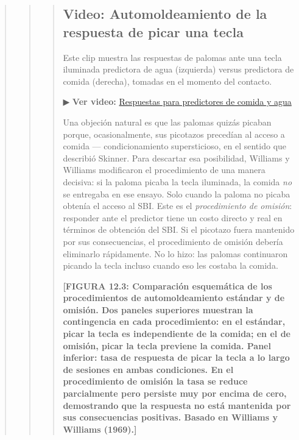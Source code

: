 \documentclass[
  letterpaper,
  DIV=11,
  numbers=noendperiod]{scrreprt}
\begin{document}
\begin{tcolorbox}[enhanced jigsaw, arc=.35mm, bottomrule=.15mm, breakable, colback=white, colframe=quarto-callout-note-color-frame, left=2mm, leftrule=.75mm, opacityback=0, rightrule=.15mm, toprule=.15mm]
\begin{quote}
\begin{quote}
\begin{quote}
\mbox{}%
\subsection{\texorpdfstring{ Video: Automoldeamiento de la
respuesta de picar una
tecla}{ Video: Automoldeamiento de la respuesta de picar una tecla}}\label{b58fc729-690b-4000-b19f-365a4093b2ff7b7b3c20666120766964656f203e7d7d-video-automoldeamiento-de-la-respuesta-de-picar-una-tecla}

Este clip muestra las respuestas de palomas ante una tecla iluminada
predictora de agua (izquierda) versus predictora de comida (derecha),
tomadas en el momento del contacto.

▶ \textbf{Ver video:}
\href{https://www.youtube.com/watch?v=cacwAvgg8EA}{Respuestas para
predictores de comida y agua}

Una objeción natural es que las palomas quizás picaban porque,
ocasionalmente, sus picotazos precedían al acceso a comida ---
condicionamiento supersticioso, en el sentido que describió Skinner.
Para descartar esa posibilidad, Williams y Williams modificaron el
procedimiento de una manera decisiva: si la paloma picaba la tecla
iluminada, la comida \emph{no} se entregaba en ese ensayo. Solo cuando
la paloma no picaba obtenía el acceso al SBI. Este es el
\emph{procedimiento de omisión}: responder ante el predictor tiene un
costo directo y real en términos de obtención del SBI. Si el picotazo
fuera mantenido por sus consecuencias, el procedimiento de omisión
debería eliminarlo rápidamente. No lo hizo: las palomas continuaron
picando la tecla incluso cuando eso les costaba la comida.

\textbf{{[}FIGURA 12.3: Comparación esquemática de los procedimientos de
automoldeamiento estándar y de omisión. Dos paneles superiores muestran
la contingencia en cada procedimiento: en el estándar, picar la tecla es
independiente de la comida; en el de omisión, picar la tecla previene la
comida. Panel inferior: tasa de respuesta de picar la tecla a lo largo
de sesiones en ambas condiciones. En el procedimiento de omisión la tasa
se reduce parcialmente pero persiste muy por encima de cero, demostrando
que la respuesta no está mantenida por sus consecuencias positivas.
Basado en Williams y Williams (1969).{]}}


\end{quote}
\end{quote}
\end{quote}
\end{tcolorbox}
\end{document}
